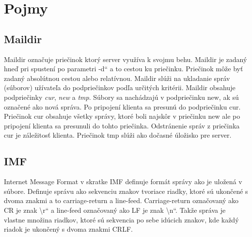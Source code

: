 \documentclass[11pt,a4paper]{article}
\providecommand{\uv}[1]{\quotedblbase #1\textquotedblleft}
\begin{document}
\section{Pojmy}

	\subsection{Maildir}
		\indent Maildir označuje priečinok ktorý server využíva k svojmu behu. Maildir je zadaný hneď pri spustení po parametri \uv{-d} a to cestou ku priečinku. Priečinok môže byť zadaný absolútnou cestou alebo relatívnou. Maildir slúži na ukladanie správ (súborov) užívateľa do podpriečinkov podľa určitých kritérii. Maildir obsahuje podpriečinky \textit{cur}, \textit{new} a \textit{tmp}. Súbory sa nachádzajú v podpriečinku new, ak sú označené ako nová správa. Po pripojení klienta sa presunú do podpriečinku cur. Priečinok cur obsahuje všetky správy, ktoré boli najskôr v priečinku new ale po pripojení klienta sa presunuli do tohto priečinka. Odstránenie správ z priečinka cur je záležitosť klienta. Priečinok tmp slúži ako dočasné úložisko pre server.

	\subsection{IMF}
		\indent Internet Message Format v skratke IMF definuje formát správy ako je uložená v súbore. Definuje správu ako sekvenciu znakov tvoriace riadky, ktoré sú ukončené s dvoma znakmi a to carriage-return a line-feed. Carriage-return označovaný ako CR je znak \uv{\textbackslash r} a line-feed označovaný ako LF je znak \uv{\textbackslash n}. Takže správa je vlastne množina riadkov, ktoré sú sekvencia po sebe idúcich znakov, kde každý riadok je ukončený s dvoma znakmi CRLF.
\end{document}
